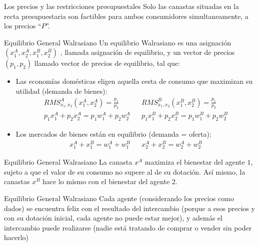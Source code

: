 \begin{frame}{Los precios y las restricciones presupuestales}
			Solo las canastas situadas en la recta presupuestaria son factibles para ambos consumidores simultaneamente, a los precios ``$P$''.\\
				\vspace{2.8cm}
			
				\vspace{4cm}
\end{frame}
\begin{frame}{Equilibrio General Walrasiano}
	Un equilibrio Walrasiano es una asignación $\left( x_{1}^{A},x_{2}^{A}, x_{1}^{B},x_{2}^{B}\right) $ , llamada asignación de equilibrio, y un vector de precios $\left( p_{1}, p_{2}\right) $ llamado vector de precios de equilibrio, tal que:
		\begin{itemize}
			\item Las economías domésticas eligen aquella cesta de consumo que maximizan su utilidad (demanda de bienes):
				$$\begin{array}{lll}
					RMS_{x_1,x_2}^{A}\left( x_{1}^{A},x_{2}^{A}\right)=\frac{p_{1}}{p_{2}} & {} & RMS_{x_1,x_2}^{B}\left( x_{1}^{B},x_{2}^{B}\right)=\frac{p_{1}}{p_{2}}\\ [0.5cm]
					p_{1}x_{1}^{A}+p_{2}x_{2}^{A}=p_{1}w_{1}^{A}+p_{2}w_{2}^{A} & {} & p_{1}x_{1}^{B}+p_{2}x_{2}^{B}=p_{1}w_{1}^{B}+p_{2}w_{2}^{B}
				\end{array}$$
			\item Los mercados de bienes están en equilibrio (demanda = oferta):
				$$\begin{array}{ccc}
					x_{1}^{A}+x_{1}^{B}=w_{1}^{A}+w_{1}^{B} & {} & x_{2}^{A}+x_{2}^{B}=w_{2}^{A}+w_{2}^{B}
				  \end{array}$$
		\end{itemize}
\end{frame}
\begin{frame}{Equilibrio General Walrasiano}
	La canasta $x^{A}$ maximiza el bienestar del agente $1$, sujeto a que el valor de su consumo no supere al de su dotación. Así mismo, la canastas $x^{B}$ hace lo mismo con el bienestar del agente 2.\\
		
\end{frame}
\begin{frame}{Equilibrio General Walrasiano}
	Cada agente (considerando los precios como dados) se encuentra feliz con el resultado del intercambio (porque a esos precios y con su dotación inicial, cada agente no puede estar mejor), y además el intercambio puede realizarse (nadie está tratando de comprar o vender sin poder hacerlo)
\end{frame}

